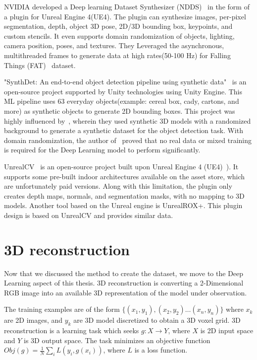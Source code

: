 NVIDIA developed a Deep learning Dataset Synthesizer (NDDS)~\cite{to2018ndds} in the form of a plugin for Unreal Engine 4(UE4).
The plugin can synthesize images, per-pixel segmentation, depth, object 3D pose, 2D/3D bounding box, keypoints, and custom stencils.
It even supports domain randomization of objects, lighting, camera position, poses, and textures.
They Leveraged the asynchronous, multithreaded frames to generate data at high rates(50-100 Hz) for Falling Things (FAT)~\cite{tremblay2018falling} dataset.

"SynthDet: An end-to-end object detection pipeline using synthetic data"~\cite{synthdet2020} is an open-source project supported by Unity technologies using Unity Engine.
This ML pipeline uses 63 everyday objects(example: cereal box, cady, cartons, and more) as synthetic objects to generate 2D bounding boxes.
This project was highly influenced by~\cite{hinterstoisser2019annotation}, wherein they used synthetic 3D models with a randomized background to generate a synthetic dataset for the object detection task.
With domain randomization, the author of~\cite{hinterstoisser2019annotation} proved that no real data or mixed training is required for the Deep Learning model to perform significantly.

UnrealCV~\cite{qiu2017unrealcv} is an open-source project built upon Unreal Engine 4 (UE4)~\cite{unrealengine}).
It supports some pre-built indoor architectures available on the asset store, which are unfortunately paid versions.
Along with this limitation, the plugin only creates depth maps, normals, and segmentation masks, with no mapping to 3D models.
Another tool based on the Unreal engine is UnrealROX+\cite{martinezgonzalez2021unrealrox}.
This plugin design is based on UnrealCV and provides similar data.


\section{3D reconstruction}\label{sec:3D reconstruction}
Now that we discussed the method to create the dataset, we move to the Deep Learning aspect of this thesis.
3D reconstruction is converting a 2-Dimensional RGB image into an available 3D representation of the model under observation.

The training examples are of the form  $\{(x_1,y_1),(x_2,y_2) \dots(x_n,y_n)\}$ where $x_k$ are 2D images, and $y_k$ are 3D model discretized to obtain a 3D voxel grid.
3D reconstruction is a learning task which seeks $g: X \to Y$, where $X$ is 2D input space and $Y$ is 3D output space.
The task minimizes an objective function $Obj(g) = \frac{1}{N} \sum_i L(y_i, g(x_i))$, where $L$ is a loss function.


